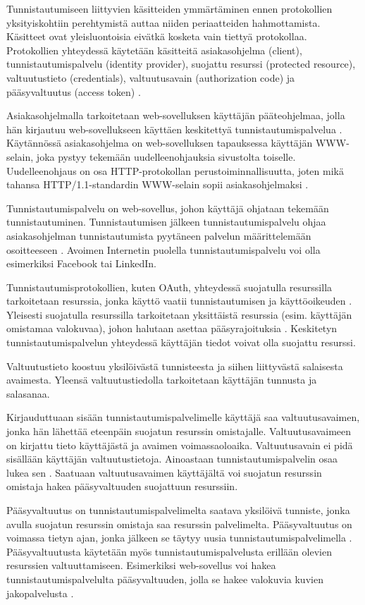 Tunnistautumiseen liittyvien käsitteiden ymmärtäminen ennen protokollien yksityiskohtiin perehtymistä auttaa niiden periaatteiden hahmottamista. Käsitteet ovat yleisluontoisia eivätkä kosketa vain tiettyä protokollaa. Protokollien yhteydessä käytetään käsitteitä asiakasohjelma (client), tunnistautumispalvelu (identity provider), suojattu resurssi (protected resource), valtuutustieto (credentials), valtuutusavain (authorization code) ja pääsyvaltuutus (access token) \cite{nisti}.

Asiakasohjelmalla tarkoitetaan web-sovelluksen käyttäjän pääteohjelmaa, jolla hän kirjautuu web-sovellukseen käyttäen keskitettyä tunnistautumispalvelua \cite{nisti}. Käytännössä asiakasohjelma on web-sovelluksen tapauksessa käyttäjän WWW-se\-lain, joka pystyy tekemään uudelleenohjauksia sivustolta toiselle. Uudelleenohjaus on osa HTTP-pro\-to\-kol\-lan perustoiminnallisuutta, joten mikä tahansa HTTP/1.1-stan\-dar\-din WWW-\-se\-lain sopii asiakasohjelmaksi \cite{rfc2616}.

Tunnistautumispalvelu on web-sovellus, johon käyttäjä ohjataan tekemään tunnistautuminen. Tunnistautumisen jälkeen tunnistautumispalvelu ohjaa asia\-kas\-oh\-jel\-man tunnistautumista pyytäneen palvelun määrittelemään osoit\-tee\-seen \cite{nisti}. Avoimen Internetin puolella tunnistautumispalvelu voi olla esimerkiksi Facebook tai LinkedIn.

Tunnistautumisprotokollien, kuten OAuth, yhteydessä suojatulla resurssilla tarkoitetaan resurssia, jonka käyttö vaatii tunnistautumisen ja käyttöoikeuden \cite{oauth2_0}. Yleisesti suojatulla resurssilla tarkoitetaan yksittäistä resurssia (esim. käyttäjän omistamaa valokuvaa), johon halutaan asettaa pääsyrajoituksia \cite{nisti}. Keskitetyn tunnistautumispalvelun yhteydessä käyttäjän tiedot voivat olla suojattu resurssi.

Valtuutustieto koostuu yksilöivästä tunnisteesta ja siihen liittyvästä salaisesta avaimesta. Yleensä valtuutustiedolla tarkoitetaan käyttäjän tunnusta ja salasanaa.

Kirjauduttuaan sisään tunnistautumispalvelimelle käyttäjä saa valtuutusavaimen, jonka hän lähettää eteenpäin suojatun resurssin omistajalle. Valtuutusavaimeen on kirjattu tieto käyttäjästä ja avaimen voimassaoloaika. Valtuutusavain ei pidä sisällään käyttäjän valtuutustietoja. Ainoastaan tunnistautumispalvelin osaa lukea sen \cite{nisti}. Saatuaan valtuutusavaimen käyttäjältä voi suojatun resurssin omistaja hakea pääsyvaltuuden suojattuun resurssiin.

Pääsyvaltuutus on tunnistautumispalvelimelta saatava yksilöivä tunniste, jonka avulla suojatun resurssin omistaja saa resurssin palvelimelta. Pääsyvaltuutus on voimassa tietyn ajan, jonka jälkeen se täytyy uusia tunnistautumispalvelimella \cite{nisti}. Pääsyvaltuutusta käytetään myös tunnistautumispalvelusta erillään olevien resurssien valtuuttamiseen. Esimerkiksi web-sovellus voi hakea tunnistautumispalvelulta pääsyvaltuuden, jolla se hakee valokuvia kuvien jakopalvelusta \cite{facebook}.